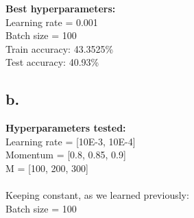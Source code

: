 \documentclass{article}
\newcommand{\1}{\mathbf{1}}
\begin{document}
{\textbf{Best hyperparameters:} \\
Learning rate = 0.001 \\
Batch size = 100 \\
Train accuracy: 43.3525\% \\
Test accuracy: 40.93\%

\begin{figure}[h]
  \centering
\end{figure}

\subsection*{b.}

\textbf{Hyperparameters tested:} \\
Learning rate = [10E-3, 10E-4] \\
Momentum = [0.8, 0.85, 0.9] \\
M = [100, 200, 300] \\ \\
Keeping constant, as we learned previously: \\
Batch size = 100

}
\end{document}
